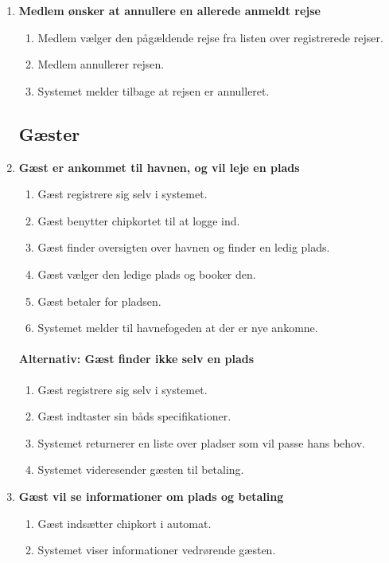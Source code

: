 \begin{enumerate}
    \item{\bf{Medlem ønsker at annullere en allerede anmeldt rejse}}
      \begin{enumerate}
        \item Medlem vælger den pågældende rejse fra listen over registrerede rejser.
        \item Medlem annullerer rejsen.
        \item Systemet melder tilbage at rejsen er annulleret.
      \end{enumerate}

	  
\subsection{Gæster}


    \item{\bf{Gæst er ankommet til havnen, og vil leje en plads}}
      \begin{enumerate}
        \item Gæst registrere sig selv i systemet.
        \item Gæst benytter chipkortet til at logge ind.
        \item Gæst finder oversigten over havnen og finder en ledig plads.
        \item Gæst vælger den ledige plads og booker den.
        \item Gæst betaler for pladsen.
        \item Systemet melder til havnefogeden at der er nye ankomne.
      \end{enumerate}

    \paragraph{Alternativ: Gæst finder ikke selv en plads}
      \begin{enumerate}
        \item Gæst registrere sig selv i systemet.
        \item Gæst indtaster sin båds specifikationer.
        \item Systemet returnerer en liste over pladser som vil passe hans behov.
        \item Systemet videresender gæsten til betaling.

      \end{enumerate}

    \item{\bf{Gæst vil se informationer om plads og betaling}}
      \begin{enumerate}
        \item Gæst indsætter chipkort i automat.
        \item Systemet viser informationer vedrørende gæsten.
      \end{enumerate}


\end{enumerate}

